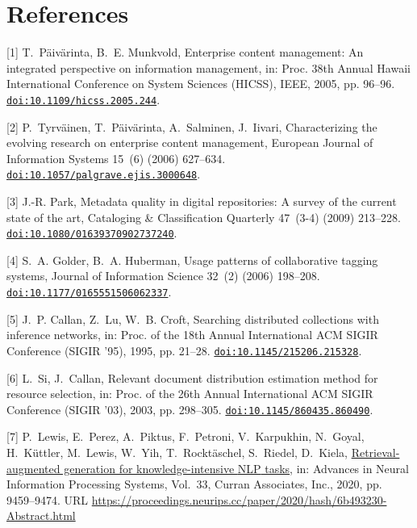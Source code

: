 \section*{References}

[1] T.~P{\"a}iv{\"a}rinta, B.~E. Munkvold, Enterprise content management: An integrated perspective on information management, in: Proc. 38th Annual Hawaii International Conference on System Sciences (HICSS), IEEE, 2005, pp. 96--96. \href {https://doi.org/10.1109/hicss.2005.244} {\texttt{doi:10.1109/hicss.2005.244}}.

[2] P.~Tyrv{\"a}inen, T.~P{\"a}iv{\"a}rinta, A.~Salminen, J.~Iivari, Characterizing the evolving research on enterprise content management, European Journal of Information Systems 15~(6) (2006) 627--634. \href {https://doi.org/10.1057/palgrave.ejis.3000648} {\texttt{doi:10.1057/palgrave.ejis.3000648}}.

[3] J.-R. Park, Metadata quality in digital repositories: A survey of the current state of the art, Cataloging \& Classification Quarterly 47~(3-4) (2009) 213--228. \href {https://doi.org/10.1080/01639370902737240} {\texttt{doi:10.1080/01639370902737240}}.

[4] S.~A. Golder, B.~A. Huberman, Usage patterns of collaborative tagging systems, Journal of Information Science 32~(2) (2006) 198--208. \href {https://doi.org/10.1177/0165551506062337} {\texttt{doi:10.1177/0165551506062337}}.

[5] J.~P. Callan, Z.~Lu, W.~B. Croft, Searching distributed collections with inference networks, in: Proc. of the 18th Annual International ACM SIGIR Conference (SIGIR '95), 1995, pp. 21--28. \href {https://doi.org/10.1145/215206.215328} {\texttt{doi:10.1145/215206.215328}}.

[6] L.~Si, J.~Callan, Relevant document distribution estimation method for resource selection, in: Proc. of the 26th Annual International ACM SIGIR Conference (SIGIR '03), 2003, pp. 298--305. \href {https://doi.org/10.1145/860435.860490} {\texttt{doi:10.1145/860435.860490}}.

[7] P.~Lewis, E.~Perez, A.~Piktus, F.~Petroni, V.~Karpukhin, N.~Goyal, H.~K{\"u}ttler, M.~Lewis, W.~Yih, T.~Rockt{\"a}schel, S.~Riedel, D.~Kiela, \href{https://proceedings.neurips.cc/paper/2020/hash/6b493230-Abstract.html}{Retrieval-augmented generation for knowledge-intensive {NLP} tasks}, in: Advances in Neural Information Processing Systems, Vol.~33, Curran Associates, Inc., 2020, pp. 9459--9474. URL \url{https://proceedings.neurips.cc/paper/2020/hash/6b493230-Abstract.html}

